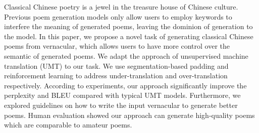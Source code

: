 Classical Chinese poetry is a jewel in the treasure house of Chinese culture.  Previous poem generation models only allow users to employ keywords to interfere the meaning of generated poems, leaving the dominion of generation to the model. In this paper, we propose a novel task of generating classical Chinese poems from vernacular, which allows users to have more control over the semantic of generated poems. We adapt the approach of unsupervised machine translation (UMT) to our task. We use segmentation-based padding and reinforcement learning to address under-translation and over-translation respectively. According to experiments, our approach significantly improve the perplexity and BLEU compared with typical UMT models. Furthermore, we explored guidelines on how to write the input vernacular to generate better poems. Human evaluation showed our approach can generate high-quality poems which are comparable to amateur poems.